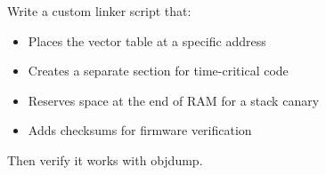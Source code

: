 \begin{exercise}[Hard]
    Write a custom linker script that:
    \begin{itemize}
        \item Places the vector table at a specific address
        \item Creates a separate section for time-critical code
        \item Reserves space at the end of RAM for a stack canary
        \item Adds checksums for firmware verification
    \end{itemize}
    Then verify it works with objdump.
\end{exercise}
